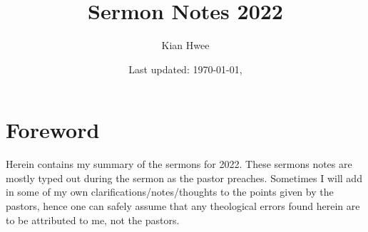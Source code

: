 \documentclass[12pt, a4paper]{article} %
\title{Sermon Notes 2022}
\author{Kian Hwee}
\date{\small Last updated: \today, \currenttime} %
\numberwithin{equation}{section} %
\theoremstyle{plain}
\theoremstyle{remark}
\theoremstyle{plain}
\theoremstyle{definition}
\theoremstyle{remark}
\begin{document}
  \maketitle
  \section*{Foreword}
    Herein contains my summary of the sermons for 2022.  These sermons notes
    are mostly typed out during the sermon as the pastor preaches.  Sometimes
    I will add in some of my own clarifications/notes/thoughts to the points
    given by the pastors, hence one can safely assume that any theological
    errors found herein are to be attributed to me, not the pastors. 
  \tableofcontents %
  
  
  
  
  
  
  
  
  
  
  
  
  
  
  
  
  
  
  
  
  
  
  
  
  
  
  
  
\end{document}

